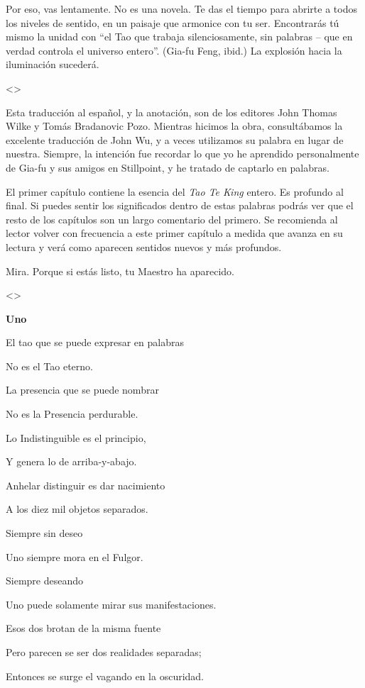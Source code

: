 Por eso, vas lentamente. No es una novela. Te das el tiempo para abrirte
a todos los niveles de sentido, en un paisaje que armonice con tu ser.
Encontrarás tú mismo la unidad con ``el Tao que trabaja silenciosamente,
sin palabras -- que en verdad controla el universo entero''. (Gia-fu
Feng, ibid.) La explosión hacia la iluminación sucederá.

\textless\textgreater{}

Esta traducción al español, y la anotación, son de los editores John
Thomas Wilke y Tomás Bradanovic Pozo. Mientras hicimos la obra,
consultábamos la excelente traducción de John Wu, y a veces utilizamos
su palabra en lugar de nuestra. Siempre, la intención fue recordar lo
que yo he aprendido personalmente de Gia-fu y sus amigos en Stillpoint,
y he tratado de captarlo en palabras.

El primer capítulo contiene la esencia del \emph{Tao Te King} entero. Es
profundo al final. Si puedes sentir los significados dentro de estas
palabras podrás ver que el resto de los capítulos son un largo
comentario del primero. Se recomienda al lector volver con frecuencia a
este primer capítulo a medida que avanza en su lectura y verá como
aparecen sentidos nuevos y más profundos.

Mira. Porque si estás listo, tu Maestro ha aparecido.

\textless\textgreater{}

\textbf{Uno}

El tao que se puede expresar en palabras

No es el Tao eterno.

La presencia que se puede nombrar

No es la Presencia perdurable.

Lo Indistinguible es el principio,

Y genera lo de arriba-y-abajo.

Anhelar distinguir es dar nacimiento

A los diez mil objetos separados.

Siempre sin deseo

Uno siempre mora en el Fulgor.

Siempre deseando

Uno puede solamente mirar sus manifestaciones.

Esos dos brotan de la misma fuente

Pero parecen se ser dos realidades separadas;

Entonces se surge el vagando en la oscuridad.

